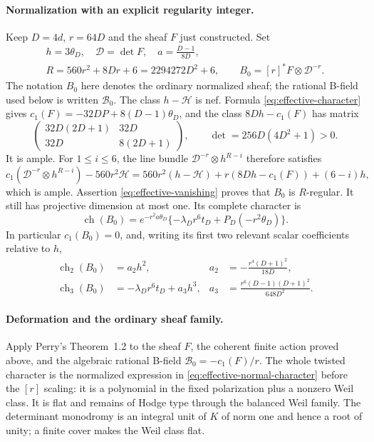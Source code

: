 \documentclass[11pt]{article}
\theoremstyle{definition}
\theoremstyle{remark}
\begin{document}
\paragraph{Normalization with an explicit regularity integer.}
Keep $D=4d$, $r=64D$ and the sheaf $F$ just constructed. Set
\begin{equation}\label{eq:effective-normalization}
\begin{gathered}
 h=3\theta_D,\quad \mathcal D=\det F,\quad
 a=\frac{D-1}{8D},\\
 R=560r^2+8Dr+6=2294272D^2+6,\qquad
 B_0=[r]^*F\otimes\mathcal D^{-r}.
\end{gathered}                                             
\end{equation}
The notation $B_0$ here denotes the ordinary normalized sheaf;
the rational B-field used below is written $\mathcal B_0$.
The class $h-\mathcal H$ is nef. Formula \eqref{eq:effective-character} gives
$c_1(F)=-32DP+8(D-1)\theta_D$, and the class
$8Dh-c_1(F)$ has matrix
\[
 \begin{pmatrix}32D(2D+1)&32D\\32D&8(2D+1)\end{pmatrix},
 \qquad\det=256D(4D^2+1)>0.
\]
It is ample. For $1\le i\le6$, the line bundle
$\mathcal D^{-r}\otimes h^{R-i}$ therefore satisfies
\[
 c_1(\mathcal D^{-r}\otimes h^{R-i})-560r^2\mathcal H
 =560r^2(h-\mathcal H)+r(8Dh-c_1(F))+(6-i)h,
\]
which is ample. Assertion \eqref{eq:effective-vanishing} proves that $B_0$ is
$R$-regular. It still has projective dimension at most one.
Its complete character is
\begin{equation}\label{eq:effective-normal-character}
 \operatorname{ch}(B_0)=e^{-r^2a\theta_D}
       \{-\lambda_Dr^6t_D+P_D(-r^2\theta_D)\}.            
\end{equation}
In particular $c_1(B_0)=0$, and, writing its first two relevant
scalar coefficients relative to $h$,
\begin{equation}\label{eq:effective-a2a3}
 \begin{aligned}
 \operatorname{ch}_2(B_0)&=a_2h^2,
 &a_2&=-\frac{r^4(D+1)^2}{18D},\\
 \operatorname{ch}_3(B_0)&=-\lambda_Dr^6t_D+a_3h^3,
 &a_3&=\frac{r^6(D-1)(D+1)^2}{648D^2}.
 \end{aligned}                                             
\end{equation}

\paragraph{Deformation and the ordinary sheaf family.}
Apply Perry's Theorem~1.2 \cite{Perry} to the sheaf $F$, the
coherent finite action proved above, and the algebraic
rational B-field $\mathcal B_0=-c_1(F)/r$. The whole twisted
character is the normalized expression in \eqref{eq:effective-normal-character} before the
$[r]$ scaling: it is a polynomial in the fixed polarization
plus a nonzero Weil class. It is flat and remains of Hodge type
through the balanced Weil family. The determinant monodromy is an integral unit of $K$ of norm one and hence a root of unity; a finite cover makes the Weil class flat.
\end{document}
